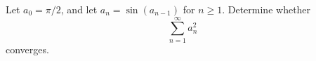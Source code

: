 Let $a_0=\pi /2$, and let $a_n=\sin (a_{n-1})$ for $n\ge 1$. Determine whether
\[ \sum_{n=1}^{\infty}a_n^2 \]converges.